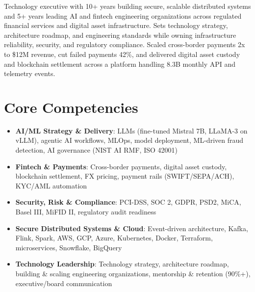 \documentclass[11pt,a4paper,sans]{moderncv}
\begin{document}
\makecvtitle


\vspace{6pt}
\small{Technology executive with 10+ years building secure, scalable distributed systems and 5+ years leading AI and fintech engineering organizations across regulated financial services and digital asset infrastructure. Sets technology strategy, architecture roadmap, and engineering standards while owning infrastructure reliability, security, and regulatory compliance. Scaled cross-border payments 2x to \$12M revenue, cut failed payments 42\%, and delivered digital asset custody and blockchain settlement across a platform handling 8.3B monthly API and telemetry events.}


\section{Core Competencies}
\vspace{1pt}
\begin{itemize}

\item \textbf{AI/ML Strategy \& Delivery}: LLMs (fine-tuned Mistral 7B, LLaMA-3 on vLLM), agentic AI workflows, MLOps, model deployment, ML-driven fraud detection, AI governance (NIST AI RMF, ISO 42001)

\item \textbf{Fintech \& Payments}: Cross-border payments, digital asset custody, blockchain settlement, FX pricing, payment rails (SWIFT/SEPA/ACH), KYC/AML automation

\item \textbf{Security, Risk \& Compliance}: PCI-DSS, SOC 2, GDPR, PSD2, MiCA, Basel III, MiFID II, regulatory audit readiness

\item \textbf{Secure Distributed Systems \& Cloud}: Event-driven architecture, Kafka, Flink, Spark, AWS, GCP, Azure, Kubernetes, Docker, Terraform, microservices, Snowflake, BigQuery

\item \textbf{Technology Leadership}: Technology strategy, architecture roadmap, building \& scaling engineering organizations, mentorship \& retention (90\%+), executive/board communication

\end{itemize}
\end{document}
